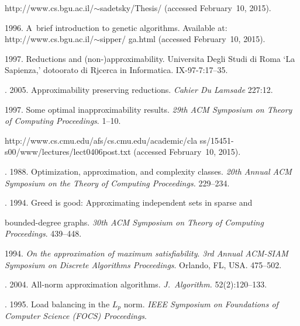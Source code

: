 \begin{multicols}{2}
{{\begin{thebibliography}{99}
{\sf http://www.cs.bgu.ac.il/$\sim$sadetsky/Thesis/}
(accessed February~10, 2015).

  1996.
A~brief introduction to genetic algorithms.
Available at: {\sf http://www.cs.bgu.ac.il/$\sim$sipper/ ga.html}
(accessed February~10, 2015).

 1997.
Reductions and (non-)approximability. Universita
Degli Studi di Roma `La Sapienza,' dotoorato di Rjcerca in
Informatica. IX-97-7:17--35.




.  2005.
Approximability preserving
reductions. \textit{Cahier Du Lamsade} 227:12.

 1997.
Some optimal inapproximability results.
\textit{29th ACM Symposium on Theory of
Computing Proceedings}.  1--10.

{\sf http://www.cs.cmu.edu/afs/cs.cmu.edu/academic/cla ss/15451-s00/www/lectures/lect0406post.txt}
(accessed February~10, 2015).

.
1988. Optimization, approximation,
and complexity classes. \textit{20th Annual ACM Symposium on the
Theory of Computing Proceedings.} %
229--234.

. 1994.
Greed is good: Approximating
independent sets in sparse and\linebreak\vspace*{-12pt}

\pagebreak

\noindent
 bounded-degree graphs. \textit{30th
ACM Symposium on Theory of Computing Proceedings}.
439--448.

  1994.
\textit{On the approximation of maximum satisfiability}.
\textit{3rd Annual ACM-SIAM Symposium on Discrete Algorithms Proceedings}.
Orlando, FL, USA.
475--502.


.
2004. All-norm approximation algorithms. \textit{J.~Algorithm.} 52(2):120--133.


. 1995. Load balancing in the $L_p$ norm.
\textit{IEEE Symposium on Foundations of Computer Science
(FOCS) Proceedings}.



\end{thebibliography}}}
\end{multicols}
